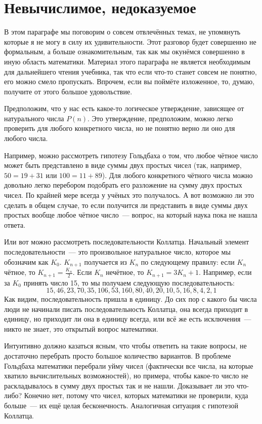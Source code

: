 \section{Невычислимое, недоказуемое}

В этом параграфе мы поговорим о совсем отвлечённых темах, не упомянуть которые я не могу в силу их удивительности. Этот разговор будет совершенно не формальным, а больше ознакомительным, так как мы окунёмся совершенно в иную область математики. Материал этого параграфа не является необходимым для дальнейшего чтения учебника, так что если что-то станет совсем не понятно, его можно смело пропускать. Впрочем, если вы поймёте изложенное, то, думаю, получите от этого большое удовольствие.

Предположим, что у нас есть какое-то логическое утверждение, зависящее от натурального числа $P(n)$. Это утверждение, предположим, можно легко проверить для любого конкретного числа, но не понятно верно ли оно для любого числа.

Например, можно рассмотреть гипотезу Гольдбаха о том, что любое чётное число может быть представлено в виде суммы двух простых чисел (так, например, $50=19+31$ или $100=11+89$). Для любого конкретного чётного числа можно довольно легко перебором подобрать его разложение на сумму двух простых чисел. По крайней мере всегда у учёных это получалось. А вот возможно ли это сделать в общем случае, то если получится ли представить в виде суммы двух простых вообще любое чётное число~--- вопрос, на который наука пока не нашла ответа.

Или вот можно рассмотреть последовательности Коллатца. Начальный элемент последовательности~--- это произвольное натуральное число, которое мы обозначим как $K_0$. $K_{n+1}$ получается из $K_n$ по следующему правилу: если $K_n$ чётное, то $K_{n+1}=\frac{K_n}{2}$. Если $K_n$ нечётное, то $K_{n+1} = 3K_n  + 1$. Например, если за $K_0$ принять число 15, то мы получаем следующую последовательность:
$$15, 46, 23, 70, 35, 106, 53, 160, 80, 40, 20, 10, 5, 16, 8, 4, 2, 1$$
Как видим, последовательность пришла в единицу. До сих пор с какого бы числа люди не начинали писать последовательность Коллатца, она всегда приходит в единицу, но приходит ли она в единицу всегда, или всё же есть исключения~--- никто не знает, это открытый вопрос математики.

Интуитивно должно казаться ясным, что чтобы ответить на такие вопросы, не достаточно перебрать просто большое количество вариантов. В проблеме Гольдбаха математики перебрали уйму чисел (фактически все числа, на которые хватило вычислительных возможностей), но примера, чтобы какое-то число не раскладывалось в сумму двух простых так и не нашли. Доказывает ли это что-либо? Конечно нет, потому что чисел, которых математики не проверили, куда больше~--- их ещё целая бесконечность. Аналогичная ситуация с гипотезой Коллатца.

